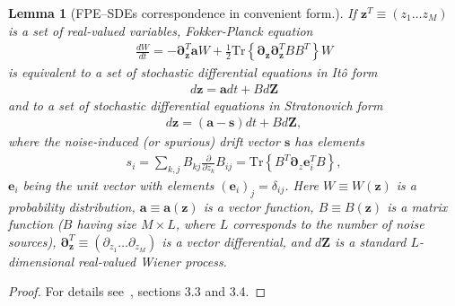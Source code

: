 \documentclass[12pt,aip,jmp,amssymb,amsmath]{revtex4-1}
\newtheorem{lemma}{Lemma}
\begin{document}
\begin{lemma}[FPE--SDEs correspondence in convenient form.]
\label{lmm:app-fpe:fpe-sde-real}
    If $\boldsymbol{z}^T \equiv (z_1 \ldots z_M)$ is a set of real-valued variables,
    Fokker-Planck equation
    \begin{eqnarray*}
        \frac{dW}{dt}
        = -\boldsymbol{\partial}_{\boldsymbol{z}}^T \boldsymbol{a} W
        + \frac{1}{2} \mathrm{Tr} \left\{ \boldsymbol{\partial}_{\boldsymbol{z}} \boldsymbol{\partial}_{\boldsymbol{z}}^T B B^T \right\} W
    \end{eqnarray*}
    is equivalent to a set of stochastic differential equations in It\^{o} form
    \begin{eqnarray*}
        d\boldsymbol{z} = \boldsymbol{a} dt + B d\boldsymbol{Z}
    \end{eqnarray*}
    and to a set of stochastic differential equations in Stratonovich form
    \begin{eqnarray*}
        d\boldsymbol{z} = (\boldsymbol{a} - \boldsymbol{s})dt + B d\boldsymbol{Z},
    \end{eqnarray*}
    where the noise-induced (or spurious) drift vector $\boldsymbol{s}$ has elements
    \begin{eqnarray*}
        s_i
        = \sum_{k,j} B_{kj} \frac{\partial}{\partial z_k} B_{ij}
        = \mathrm{Tr} \left\{ B^T \boldsymbol{\partial}_z \boldsymbol{e}_i^T B \right\},
    \end{eqnarray*}
    $\boldsymbol{e}_i$ being the unit vector with elements $(\boldsymbol{e}_i)_j = \delta_{ij}$.
    Here $W \equiv W(\boldsymbol{z})$ is a probability distribution,
    $\boldsymbol{a} \equiv \boldsymbol{a}(\boldsymbol{z})$ is a vector function,
    $B \equiv B(\boldsymbol{z})$ is a matrix function ($B$ having size $M \times L$, where $L$ corresponds to the number of noise sources),
    $\boldsymbol{\partial}_{\boldsymbol{z}}^T \equiv (\partial_{z_1} \ldots \partial_{z_M})$ is a vector differential,
    and $d\boldsymbol{Z}$ is a standard $L$-dimensional real-valued Wiener process.
\end{lemma}
\begin{proof}
For details see~\cite{Risken1996}, sections 3.3 and 3.4.
\end{proof}
\end{document}
